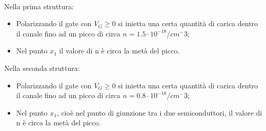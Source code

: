 \hfill
\begin{minipage}{0.5\textwidth}\raggedleft
    \begin{center}
    \label{fig:enter-label}
\end{center}
\end{minipage}
\\%
Nella prima struttura:
\begin{itemize}
    \item Polarizzando il gate con $V_G \geq 0 $ si inietta una certa quantità di carica dentro il canale fino ad un picco di circa $n=1.5 \cdot 10^{-18}/cm^-3$;
    \item Nel punto $x_1$ il valore di n è circa la metà del picco.
\end{itemize}
Nella seconda struttura:
\begin{itemize}
    \item Polarizzando il gate con $V_G \geq 0 $ si inietta una certa quantità di carica dentro il canale fino ad un picco di circa $n=0.8 \cdot 10^{-18}/cm^-3$;
    \item Nel punto $x_1$, cioè nel punto di giunzione tra i due semiconduttori, il valore di n è circa la metà del picco.
\end{itemize}

